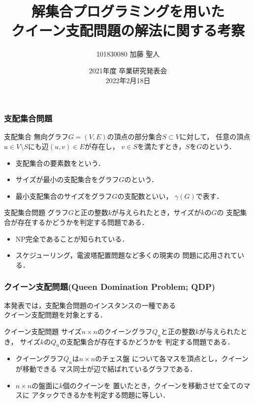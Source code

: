 \documentclass[dvipdfmx,10pt]{beamer}
\begin{document}
\title{解集合プログラミングを用いた\\クイーン支配問題の解法に関する考察}
\author{101830080 \quad 加藤 聖人}
\date{2021年度 卒業研究発表会 \\ 2022年2月18日}

%
%

\begin{frame}\frametitle{}
 \titlepage
\end{frame}

%
%

\begin{frame}\frametitle{支配集合問題}
 \begin{block}{支配集合}
  無向グラフ$G=(V,E)$の頂点の部分集合$S\subset V$に対して，
任意の頂点$u \in V\setminus S$にも辺$(u,v) \in E$が存在し，
$v \in S$を満たすとき，$S$を$G$のという．
  \begin{itemize}
   \item 支配集合の要素数をという．
   \item サイズが最小の支配集合をグラフ$G$のという．
   \item 最小支配集合のサイズをグラフ$G$の\alert{支配数}といい，
$\gamma(G)$で表す．
  \end{itemize}
 \end{block}
 \begin{block}{支配集合問題}
  グラフ$G$と正の整数$k$が与えられたとき，サイズが$k$の$G$の
支配集合が存在するかどうかを判定する問題である．
  \begin{itemize}
   \item NP完全であることが知られている．
   \item スケジューリング，電波塔配置問題など多くの現実の
	 問題に応用されている．
  \end{itemize}
 \end{block}
\end{frame}

%
%

\begin{frame}\frametitle{クイーン支配問題(Queen Domination Problem; QDP)}
  \begin{alertblock}{} \centering
    本発表では，支配集合問題のインスタンスの一種である\\
    \alert{クイーン支配問題}を対象とする．
  \end{alertblock}
 \begin{block}{クイーン支配問題}
  サイズ$n\times n$のクイーングラフ$Q_n$と正の整数$k$が与えられたとき，
  サイズ$k$の$Q_n$の支配集合が存在するかどうかを
  判定する問題である．
  \begin{itemize}
   \item クイーングラフ$Q_n$は$n\times n$のチェス盤
	 について各マスを頂点とし，クイーンが移動できる
	 マス同士が辺で結ばれているグラフである．
   \item $n \times n$の盤面に$k$個のクイーンを
	 置いたとき，クイーンを移動させて全てのマスに
	 アタックできるかを判定する問題に等しい．
  \end{itemize}
 \end{block}
\end{frame}
 
\end{document}
